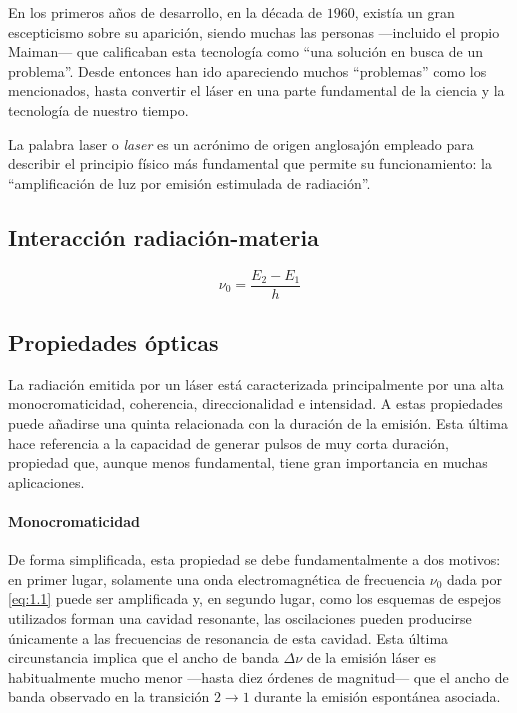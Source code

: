En los primeros años de desarrollo, en la década de $1960$, existía un gran escepticismo sobre su aparición, siendo muchas las personas ---incluido el propio Maiman--- que calificaban esta tecnología como \enquote{una solución en busca de un problema}. Desde entonces han ido apareciendo muchos \enquote{problemas} como los mencionados, hasta convertir el láser en una parte fundamental de la ciencia y la tecnología de nuestro tiempo.

La palabra \acrshort{laser} o \emph{\acrlong{laser}} es un acrónimo de origen anglosajón empleado para describir el principio físico más fundamental que permite su funcionamiento: la \enquote{amplificación de luz por emisión estimulada de radiación}.

\subsection{Interacción radiación-materia}\label{sec:1.1.1}

\begin{equation}\label{eq:1.1}
    \nu_0 = \dfrac{E_2-E_1}{h}
\end{equation}

\subsection{Propiedades ópticas}\label{sec:1.1.2}
La radiación emitida por un láser está caracterizada principalmente por una alta monocromaticidad, coherencia, direccionalidad e intensidad. A estas propiedades puede añadirse una quinta relacionada con la duración de la emisión\autocite{Svelto2010PrinciplesLasers}. Esta última hace referencia a la capacidad de generar pulsos de muy corta duración, propiedad que, aunque menos fundamental, tiene gran importancia en muchas aplicaciones. 

\paragraph{Monocromaticidad}\label{par:1.1.2.1}
De forma simplificada, esta propiedad se debe fundamentalmente a dos motivos: en primer lugar, solamente una onda electromagnética de frecuencia $\nu_0$ dada por \eqref{eq:1.1} puede ser amplificada y, en segundo lugar, como los esquemas de espejos utilizados forman una cavidad resonante, las oscilaciones pueden producirse únicamente a las frecuencias de resonancia de esta cavidad. Esta última circunstancia implica que el ancho de banda $\Delta\nu$ de la emisión láser es habitualmente mucho menor ---hasta diez órdenes de magnitud--- que el ancho de banda observado en la transición $2\rightarrow 1$ durante la emisión espontánea asociada.

